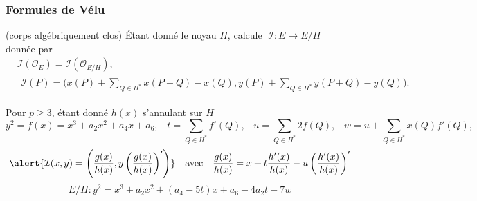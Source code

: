 \documentclass[10pt]{beamer}
\renewcommand{\ge}{\geqslant}  %
\newcommand{\0}{\mathcal{O}}  %
\newcommand{\isog}[1]{\mathcal{#1}}  %
\newcommand{\I}{\isog{I}}  %
\begin{document}
\begin{frame}
  \frametitle{Formules de Vélu}
  
  \begin{block}{\cite{velu71} (corps algébriquement clos)}
    Étant donné le noyau $H$, calcule $\;\I : E\to E/H\;$ donnée par 
    \begin{align*}
      &\I(\0_E) = \I(\0_{E/H})\text{,}\\
      &\begin{aligned}
        \I(P) = \Biggl(x(P) + \sum_{Q\in H^\ast}x(P+Q) - x(Q),
        y(P) + \sum_{Q\in H^\ast}y(P+Q) - y(Q) \Biggr) \text{.}
      \end{aligned}
    \end{align*}
  \end{block}

  \begin{block}{Pour $p\ge 3$, étant donné $h(x)$ s'annulant sur $H$}
    {\footnotesize
      \[
      y^2 = f(x) = x^3 + a_2x^2 + a_4x + a_6\text{,}
      \quad
      t = \!\!\sum_{Q\in H^\ast} \!\!\!f'(Q)\text{,}
      \quad
      u = \!\!\sum_{Q\in H^\ast} \!\!\!2f(Q)\text{,}
      \quad
      w = u + \!\!\sum_{Q\in H^\ast} \!\!\!x(Q)f'(Q)\text{,}\]}
    \[\alert{\I(x,y) = \left(\frac{g(x)}{h(x)}, y\left(\frac{g(x)}{h(x)}\right)'\right)}
    \quad\text{avec}\quad
    \frac{g(x)}{h(x)} = x + t\frac{h'(x)}{h(x)} - u\left(\frac{h'(x)}{h(x)}\right)'\]
    \[E/H : y^2 = x^3 + a_2x^2 + (a_4 - 5t)x + a_6 - 4a_2t - 7w\]
  \end{block}
\end{frame}

\end{document}
